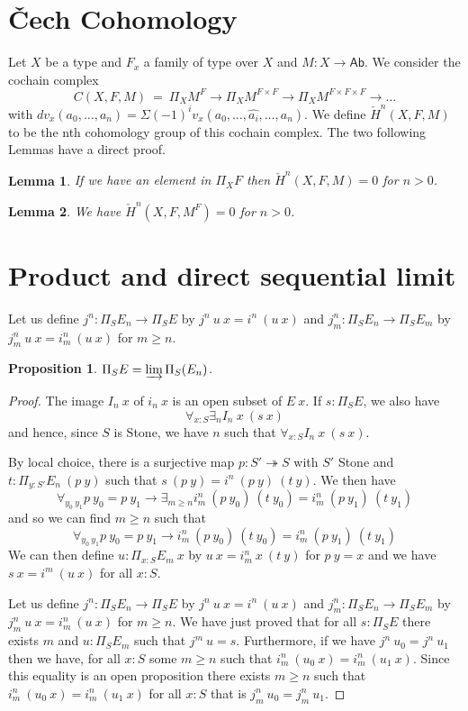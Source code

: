 \documentclass[10pt,a4paper]{article}
\newtheorem{lemma}{Lemma}[section]
\newtheorem{proposition}{Proposition}[section]
\newcommand{\ras}{\twoheadrightarrow}
\newcommand{\AbG}{\mathsf{Ab}}
\newcommand{\ra}{\rightarrow}
\newcommand\cHH{\check{H}}%
\begin{document}
\section{\v{C}ech Cohomology}

Let $X$ be a type and $F_x$ a family of type over $X$ and $M:X\rightarrow \AbG$. We consider the cochain
complex
$$
C(X,F,M) ~=~ \Pi_XM^F\ra \Pi_XM^{F\times F}\ra \Pi_XM^{F\times F\times F}\ra\dots
$$
with $dv_x(a_0,\dots,a_n) = \Sigma (-1)^iv_x(a_0,\dots,\hat{a_i},\dots,a_n)$.
We define $\cHH^n(X,F,M)$ to be the nth cohomology group of this cochain complex. The two following Lemmas
have a direct proof.

\begin{lemma}\label{cech1}
  If we have an element in $\Pi_XF$ then $\cHH^n(X,F,M) = 0$ for $n>0$.
\end{lemma}

\begin{lemma}\label{cech2}
  We have $\cHH^n(X,F,M^F) = 0$ for $n>0$.
\end{lemma}

\section{Product and direct sequential limit}

Let us define $j^n:\Pi_SE_n\ra \Pi_SE$ by $j^n~u~x = i^n~(u~x)$ and
$j^n_m :\Pi_SE_n\ra \Pi_SE_m$ by $j^n_m~u~x = i^n_m~(u~x)$ for $m\geqslant n$.

\begin{proposition}
   $\Pi_SE = \varinjlim \Pi_S(E_n)$. 
\end{proposition}

\begin{proof}
The image $I_n~x$ of $i_n~x$ is an open subset of $E~x$. If $s:\Pi_SE$, we also have
$$
\forall_{x:S}\exists_n I_n~x~(s~x)
$$
and hence, since $S$ is Stone, we have $n$ such that $\forall_{x:S} I_n~x~(s~x)$.

By local choice, there is a surjective map $p:S'\ras S$ with $S'$ Stone and $t:\Pi_{y:S'}E_n~(p~y)$
such that $s~(p~y) = i^n~(p~y)~(t~y)$. We then have
$$\forall_{y_0~y_1}p~y_0=p~y_1\ra \exists_{m\geqslant n} i^n_m~(p~y_0)~(t~y_0) = i^n_m~(p~y_1)~(t~y_1)$$
and so we can find $m\geqslant n$ such that
$$\forall_{y_0~y_1}p~y_0=p~y_1\ra i^n_m~(p~y_0)~(t~y_0) = i^n_m~(p~y_1)~(t~y_1)$$
We can then define $u:\Pi_{x:S}E_m~x$ by $u~x = i^n_m~x~(t~y)$ for $p~y = x$ and we have $s~x = i^m~(u~x)$
for all $x:S$.

Let us define $j^n:\Pi_SE_n\ra \Pi_SE$ by $j^n~u~x = i^n~(u~x)$ and
$j^n_m :\Pi_SE_n\ra \Pi_SE_m$ by $j^n_m~u~x = i^n_m~(u~x)$ for $m\geqslant n$.
We have just proved that for all
$s:\Pi_SE$ there exists $m$ and $u:\Pi_SE_m$ such that $j^m~u = s$.
Furthermore, if we have $j^n~u_0 = j^n~u_1$ then we have, for all $x:S$
some $m\geqslant n$ such that $i^n_m~(u_0~x) = i^n_m~(u_1~x)$. Since this equality is an open proposition
there exists $m\geqslant n$ such that  $i^n_m~(u_0~x) = i^n_m~(u_1~x)$ for all $x:S$ that is
$j^n_m~u_0 = j^n_m~u_1$.
\end{proof}
\end{document}
